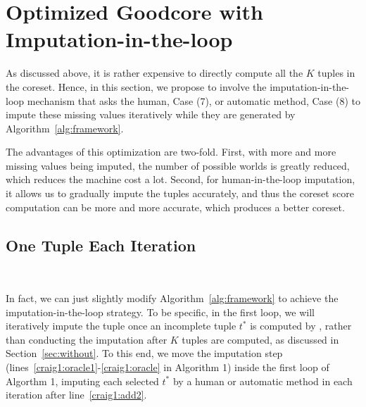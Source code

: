 \section{Optimized Goodcore with Imputation-in-the-loop}
\label{sec:human}


As discussed above, it is rather expensive to directly compute all the $K$ tuples in the coreset.  Hence, in this section, we propose to involve the imputation-in-the-loop mechanism that asks the human, \ie Case (7), or automatic method, \ie Case (8) to impute these missing values iteratively while they are generated by Algorithm~\ref{alg:framework}.


The advantages of this optimization are two-fold. First, with more and more missing values being imputed, the number of possible worlds is greatly reduced, which reduces the machine cost a lot. Second, for human-in-the-loop imputation, it allows us to  gradually impute the tuples accurately, and thus the coreset score computation can be more and more accurate, which produces a better coreset.





\subsection{One Tuple Each Iteration}~\label{subsec:one}



In fact, we can just slightly modify Algorithm~\ref{alg:framework} to  achieve the imputation-in-the-loop strategy.
To be specific,  in the first loop, we will iteratively impute the tuple   once an incomplete  tuple $t^*$ is computed by \ours, rather than conducting the imputation after $K$ tuples are computed, as discussed in Section~\ref{sec:without}. To this end, we move the imputation step (lines~\ref{craig1:oracle1}-\ref{craig1:oracle} in Algorithm 1) inside the first loop of Algorthm 1, \ie imputing each selected $t^{*}$ by a human or automatic method in each iteration after line~\ref{craig1:add2}.




